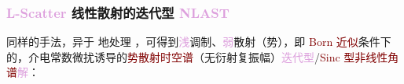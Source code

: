 \subsubsection{\textcolor{Plum}{L-Scatter} 线性散射的迭代型 \textcolor{Plum}{NLAST}}\label{sssec:NLAST_sinc-holo_L}

同样的手法，异于  地处理 ，可得到\textcolor{Plum}{浅}\textcolor{NavyBlue}{调制}、\textcolor{Plum}{弱}\textcolor{NavyBlue}{散射}（\textcolor{NavyBlue}{势}），即 \textcolor{Maroon}{Born 近似}条件下的，\textcolor{PineGreen}{介电常数微扰}诱导的\textcolor{Maroon}{势散射}\textcolor{Maroon}{时空谱}（\textcolor{NavyBlue}{无衍射}\textcolor{PineGreen}{复振幅}）\textcolor{Plum}{迭代型}/\textcolor{Maroon}{Sinc 型}\textcolor{Maroon}{非线性角谱}\textcolor{Plum}{解}：

